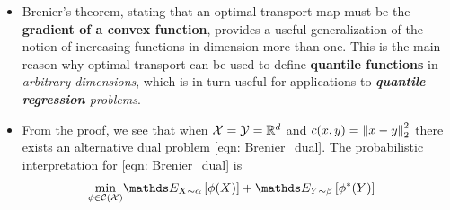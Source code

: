 \documentclass[11pt]{article}
\begin{document}
\begin{itemize}
\begin{proof}
Note that the support of $\pi$ is bounded by the equality condition
\begin{align}
\text{Supp}(\pi)  \subset \set{(x, y) \in \cX \times \cY:  \lambda(x) + \phi^{*}(y) = \inn{x}{y}},
\end{align} which shows that such a $y$ is optimal for the minimization \eqref{eqn: Brenier_conjugate} of the Legendre transform, whose optimality condition reads
$y \in \partial \phi(x)$, the \emph{\textbf{sub-differential}} of $\phi$ \citep{rockafellar1970convex}. 

Since $\phi$ is convex, it is \emph{differentiable} everywhere,  and since $\alpha$ has a density, it is also differentiable \emph{$\alpha$-almost everywhere}.  This shows that for each $x$, the associated $y$ is \textbf{uniquely} defined \emph{$\alpha$-almost everywhere} as $y = \grad{}{\phi}(x)$, and it shows that necessarily $\pi = (\text{Id}, \grad{}{\phi})_{\#}\alpha$.
\qed
\end{proof}

\item  \begin{remark}
Brenier's theorem, stating that an optimal transport map must be the \textbf{gradient of a convex function}, provides a useful generalization of the notion of increasing functions in dimension more than one. This is the main reason why optimal transport can be used to define \textbf{quantile functions} in \emph{arbitrary dimensions}, which is in turn useful for applications to \emph{\textbf{quantile regression} problems}.
\end{remark}

\item 
From the proof, we see that when ${\mathcal X} = {\mathcal Y} = {\mathbb R}^d$ and $c(x, y) = \left\|x -y\right\|_{2}^2$ there exists an alternative dual problem \eqref{eqn: Brenier_dual}. The probabilistic interpretation for \eqref{eqn: Brenier_dual} is
\begin{align}
\min_{\phi\in \cC(\cX)} & \E{X \sim \alpha}{\phi(X)} +  \E{Y \sim \beta}{\phi^{*}(Y)} \label{eqn: Brenier_dual_prob}
\end{align}
\end{itemize}
\end{document}
